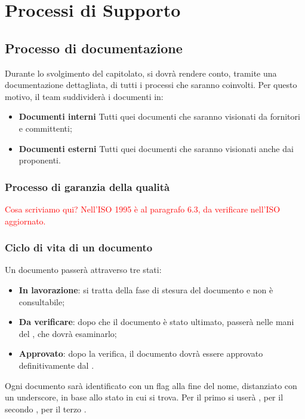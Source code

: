 \newpage
\section{Processi di Supporto}
\subsection{Processo di documentazione}
Durante lo svolgimento del capitolato, si dovrà rendere conto, tramite una documentazione dettagliata, di tutti i processi che saranno coinvolti. 
Per questo motivo, il team suddividerà i documenti in:
\begin{itemize}
	\item \textbf{Documenti interni}
	\newline Tutti quei documenti che saranno visionati da fornitori e committenti;
	\item \textbf{Documenti esterni}
	\newline Tutti quei documenti che saranno visionati anche dai proponenti.
	
\end{itemize}
\subsubsection{Processo di garanzia della qualità}
\textcolor{red}{Cosa scriviamo qui? Nell'ISO 1995 è al paragrafo 6.3, da verificare nell'ISO aggiornato.}

\subsubsection{Ciclo di vita di un documento}
Un documento passerà attraverso tre stati:
\begin{itemize}
	\item \textbf{In lavorazione}:
	si tratta della fase di stesura del documento e non è consultabile;
	\item \textbf{Da verificare}:
	dopo che il documento è stato ultimato, passerà nelle mani del \ver, che dovrà esaminarlo;
	\item \textbf{Approvato}:
	dopo la verifica, il documento dovrà essere approvato definitivamente dal \RdP.
\end{itemize}
Ogni documento sarà identificato con un flag alla fine del nome, distanziato con un underscore, in base allo stato in cui si trova. 
Per il primo si userà \emph{}, per il secondo \emph{}, per il terzo \emph{}.
